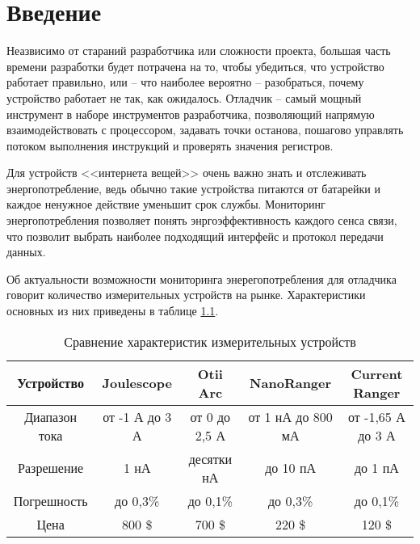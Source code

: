 
\chapter{Введение}
\hspace{1cm} Неазвисимо от стараний разработчика или сложности проекта, большая часть времени разработки
будет потрачена на то, чтобы убедиться, что устройство работает правильно, или -- что наиболее
вероятно -- разобраться, почему устройство работает не так, как ожидалось. Отладчик -- самый мощный 
инструмент в наборе инструментов разработчика, позволяющий напрямую взаимодействовать с процессором,
задавать точки останова, пошагово управлять потоком выполнения инструкций и проверять  значения
регистров. \cite{Lakamera:embed}

Для устройств <<интернета вещей>> очень важно знать и отслеживать энергопотребление,
ведь обычно такие устройства питаются от батарейки и каждое ненужное действие уменьшит
срок службы. Мониторинг энергопотребления позволяет понять энргоэффективность каждого сенса связи,
что позволит выбрать наиболее подходящий интерфейс и протокол передачи данных.

Об актуальности возможности мониторинга энерегопотребления для отладчика говорит количество 
измерительных устройств на рынке. Характеристики основных из них приведены в таблице 
\ref{comparemeasdevices}.

\begin{table}[H]
    \caption{Сравнение характеристик измерительных устройств}
    \label{comparemeasdevices}   
    \begin{center}
    \begin{tabular}{|c|c|c|c|c|}
    \hline
  Устройство & Joulescope & Otii Arc & NanoRanger & Current Ranger \\ \hline
    Диапазон тока & от -1 А до 3 А & от 0 до 2,5 А & от 1 нА до 800 мА & от -1,65 А до 3 А \\ \hline
    Разрешение & 1 нА & десятки нА & до 10 пА & до 1 пА  \\ \hline
    Погрешность & до 0,3\% & до 0,1\% & до 0,3\% & до 0,1\% \\ \hline
    Цена & 800 \$ & 700 \$ & 220 \$ & 120 \$  \\ \hline
    \end{tabular}
    \end{center}
\end{table} 


